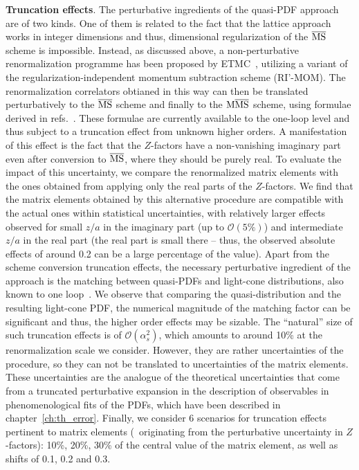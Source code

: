 \textbf{Truncation effects}. The perturbative ingredients of the quasi-PDF
approach are of two kinds. One of them is related to the fact that the lattice
approach works in integer dimensions and thus, dimensional regularization of the
$\overline{\mathrm{MS}}$ scheme is impossible. Instead, as discussed above, a non-perturbative
renormalization programme has been proposed by ETMC~\cite{Alexandrou:2017huk},
utilizing a variant of the regularization-independent momentum subtraction
scheme (RI'-MOM). The renormalization correlators obtianed in this way can then
be translated perturbatively to the $\overline{\mathrm{MS}}$ scheme and finally to the ${\rm M}\overline{\mathrm{MS}}$
scheme, using formulae derived in refs.~\cite{Constantinou:2017sej,
Alexandrou:2019lfo}. These formulae are currently available to the one-loop
level and thus subject to a truncation effect from unknown higher orders. A
manifestation of this effect is the fact that the $Z$-factors have a
non-vanishing imaginary part even after conversion to $\overline{\mathrm{MS}}$, where they should
be purely real. To evaluate the impact of this uncertainty, we compare the
renormalized matrix elements with the ones obtained from applying only the real
parts of the $Z$-factors. We find that the matrix elements obtained by this
alternative procedure are compatible with the actual ones within statistical
uncertainties, with relatively larger effects observed for small $z/a$ in the
imaginary part (up to $\mathcal{O}(5\%)$) and intermediate $z/a$ in the real
part (the real part is small there -- thus, the observed absolute effects of
around 0.2 can be a large percentage of the value). Apart from the scheme
conversion truncation effects, the necessary perturbative ingredient of the
approach is the matching between quasi-PDFs and light-cone distributions, also
known to one loop~\cite{Xiong:2013bka,Izubuchi:2018srq,Alexandrou:2019lfo}.
We observe that comparing the quasi-distribution and the resulting light-cone PDF, the numerical
magnitude of the matching factor can be significant and thus, the higher order
effects may be sizable. The ``natural'' size of such truncation effects is of
$\mathcal{O}(\alpha_s^2)$, which amounts to around 10\% at the renormalization
scale we consider. However, they are rather uncertainties of the procedure, so
they can not be translated to uncertainties of the matrix elements. These
uncertainties are the analogue of the theoretical uncertainties that come from a
truncated perturbative expansion in the description of observables in
phenomenological fits of the PDFs, which have been described in chapter~\ref{ch:th_error}.
Finally, we consider 6 scenarios for truncation effects
pertinent to matrix elements (\ie\ originating from the perturbative uncertainty
in $Z$-factors): 10\%, 20\%, 30\% of the central value of the matrix element, as
well as shifts of 0.1, 0.2 and 0.3. 

